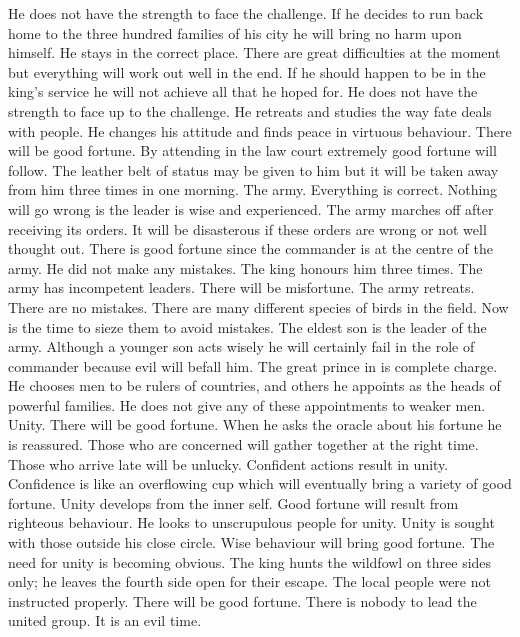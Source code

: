 	{He does not have the strength to face the challenge. If he decides to run back home to the three
   		hundred families of his city he will bring no harm upon himself.}
	{He stays in the correct place. There are great difficulties at the moment but everything will work
		out well in the end. If he should happen to be in the king's service he will not achieve all that
		he hoped for.}
	{He does not have the strength to face up to the challenge. He retreats and studies the way fate
		deals with people. He changes his attitude and finds peace in virtuous behaviour. There will
		be good fortune.}
	{By attending in the law court extremely good fortune will follow.}
	{The leather belt of status may be given to him but it will be taken away from him three times in
		one morning.}
\or {}
	{The army. Everything is correct. Nothing will go wrong is the leader is wise and experienced.}
	{The army marches off after receiving its orders. It will be disasterous if these orders are wrong
		or not well thought out.}
	{There is good fortune since the commander is at the centre of the army. He did not make any mistakes.
		The king honours him three times.}
	{The army has incompetent leaders. There will be misfortune.}
	{The army retreats. There are no mistakes.}
	{There are many different species of birds in the field. Now is the time to sieze them to avoid
		mistakes. The eldest son is the leader of the army. Although a younger son acts wisely he will
		certainly fail in the role of commander because evil will befall him.}
	{The great prince in is complete charge. He chooses men to be rulers of countries, and others he
		appoints as the heads of powerful families. He does not give any of these appointments to weaker men.}
\or {}
	{Unity. There will be good fortune. When he asks the oracle about his fortune he is
		reassured. Those who are concerned will gather together at the right time. Those
		who arrive late will be unlucky.}
	{Confident actions result in unity. Confidence is like an overflowing cup which will
		eventually bring a variety of good fortune.}
	{Unity develops from the inner self. Good fortune will result from righteous behaviour.}
	{He looks to unscrupulous people for unity.}
	{Unity is sought with those outside his close circle. Wise behaviour will bring
		good fortune.}
	{The need for unity is becoming obvious. The king hunts the wildfowl on three sides
		only; he leaves the fourth side open for their escape. The local people were not
		instructed properly. There will be good fortune.}
	{There is nobody to lead the united group. It is an evil time.}
